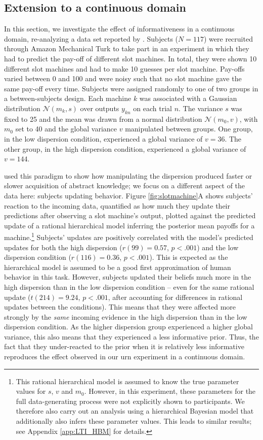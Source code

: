 \subsection{Extension to a continuous domain}

In this section, we investigate the effect of informativeness in a continuous domain, re-analyzing a data set reported by \citet{gershman2017blessing}. Subjects ($N=117$) were recruited through Amazon Mechanical Turk to take part in an experiment in which they had to predict the pay-off of different slot machines. In total, they were shown 10 different slot machines and had to make 10 guesses per slot machine. Pay-offs varied between 0 and 100 and were noisy such that no slot machine gave the same pay-off every time. Subjects were assigned randomly to one of two groups in a between-subjects design. Each machine $k$ was associated with a Gaussian distribution $\mathcal{N}(m_k,s)$ over outputs $y_{kn}$ on each trial $n$. The variance $s$ was fixed to 25 and the mean was drawn from a normal distribution $\mathcal{N}(m_0, v)$, with $m_0$ set to 40 and the global variance $v$ manipulated between groups. One group, in the low dispersion condition, experienced a global variance of $v=36$. The other group, in the high dispersion condition, experienced a global variance of $v=144$.

\citet{gershman2017blessing} used this paradigm to show how manipulating the dispersion produced faster or slower acquisition of abstract knowledge; we focus on a different aspect of the data here: subjects updating behavior. Figure \ref{fig:slotmachine}A shows subjects' reaction to the incoming data, quantified as how much they update their predictions after observing a slot machine's output, plotted against the predicted update of a rational hierarchical model inferring the posterior mean payoffs for a machine.\footnote{This rational hierarchical model is assumed to know the true parameter values for $s$, $v$ and $m_0$. However, in this experiment, these parameters for the full data-generating process were not explicitly shown to participants. We therefore also carry out an analysis using a hierarchical Bayesian model that additionally also infers these parameter values. This leads to similar results; see Appendix \ref{app:LTI_HBM} for details.} Subjects' updates are positively correlated with the model's predicted updates for both the high dispersion ($r(99)=0.57$, $p<.001$) and the low dispersion condition ($r(116)=0.36$, $p<.001$). This is expected as the hierarchical model is assumed to be a good first approximation of human behavior in this task. However, subjects updated their beliefs much more in the high dispersion than in the low dispersion condition -- even for the same rational update ($t(214)=9.24$, $p<.001$, after accounting for differences in rational updates between the conditions). This means that they were affected more strongly by the \textit{same} incoming evidence in the high dispersion than in the low dispersion condition. As the higher dispersion group experienced a higher global variance, this also means that they experienced a less informative prior. Thus, the fact that they under-reacted to the prior when it is relatively less informative reproduces the effect observed in our urn experiment in a continuous domain.

